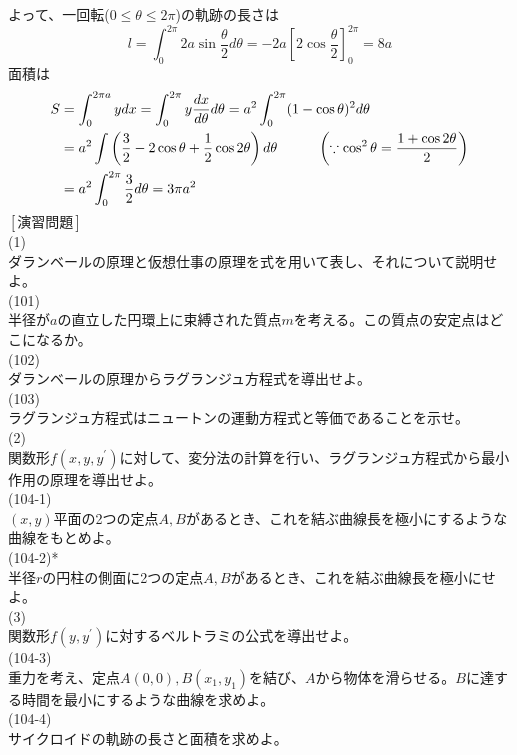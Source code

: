 \documentclass{jsarticle}
\begin{document}
よって、一回転(\(0\leq\theta\leq2\pi\))の軌跡の長さは
\[l=\int_{0}^{2\pi}2a\sin\frac{\theta}{2}d\theta=-2a\left[2\cos\frac{\theta}{2}\right]_{0}^{2\pi}=8a\]
面積は
\begin{align*}
S&=\int_{0}^{2\pi a}ydx=\int_{0}^{2\pi}y\frac{dx}{d\theta}d\theta=a^{2}\int_{0}^{2\pi}(1-\cos\theta)^{2}d\theta\\
&=a^{2}\int\left(\frac{3}{2}-2\cos\theta+\frac{1}{2}\cos2\theta\right)d\theta\hspace{10mm}\left(\because\cos^{2}\theta=\frac{1+\cos2\theta}{2}\right)\\
&=a^{2}\int_{0}^{2\pi}\frac{3}{2}d\theta=3\pi a^{2}
\end{align*}
\newpage
\noindent
\([演習問題]\)\\
(1)\\
ダランベールの原理と仮想仕事の原理を式を用いて表し、それについて説明せよ。\\
(101)\\
半径が\(a\)の直立した円環上に束縛された質点\(m\)を考える。この質点の安定点はどこになるか。\\
(102)\\
ダランベールの原理からラグランジュ方程式を導出せよ。\\
(103)\\
ラグランジュ方程式はニュートンの運動方程式と等価であることを示せ。\\
(2)\\
関数形\(f(x,y,y^{\prime})\)に対して、変分法の計算を行い、ラグランジュ方程式から最小作用の原理を導出せよ。\\
(104-1)\\
\((x,y)\)平面の2つの定点\(A,B\)があるとき、これを結ぶ曲線長を極小にするような曲線をもとめよ。\\
(104-2)*\\
半径\(r\)の円柱の側面に2つの定点\(A,B\)があるとき、これを結ぶ曲線長を極小にせよ。\\
(3)\\
関数形\(f(y,y^{\prime})\)に対するベルトラミの公式を導出せよ。\\
(104-3)\\
重力を考え、定点\(A(0,0),B(x_{1},y_{1})\)を結び、\(A\)から物体を滑らせる。\(B\)に達する時間を最小にするような曲線を求めよ。\\
(104-4)\\
サイクロイドの軌跡の長さと面積を求めよ。\\
\end{document}
